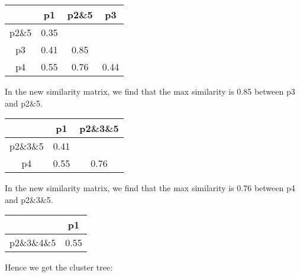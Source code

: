 \begin{table}[H]
    \centering
    \begin{tabular}{@{}c|ccc@{}}
        \hline
        & p1 & p2\&5 & p3 \\
        \hline

        p2\&5 & 0.35 &      &      \\
        p3 & 0.41 & 0.85 &      \\
        p4 & 0.55 & 0.76 & 0.44 \\
    \end{tabular}
\end{table}

In the new similarity matrix, we find that the max similarity is 0.85 between p3 and p2\&5.

\begin{table}[!h]
    \centering
    \begin{tabular}{@{}c|cc@{}}
        \hline
        & p1 & p2\&3\&5 \\
        \hline

        p2\&3\&5 & 0.41 &      \\
        p4 & 0.55 & 0.76 \\
    \end{tabular}
\end{table}

In the new similarity matrix, we find that the max similarity is 0.76 between p4 and p2\&3\&5.

\begin{table}[!h]
    \centering
    \begin{tabular}{@{}c|c@{}}
        \hline
        & p1 \\
        \hline

        p2\&3\&4\&5 & 0.55 \\
    \end{tabular}
\end{table}

Hence we get the cluster tree:

